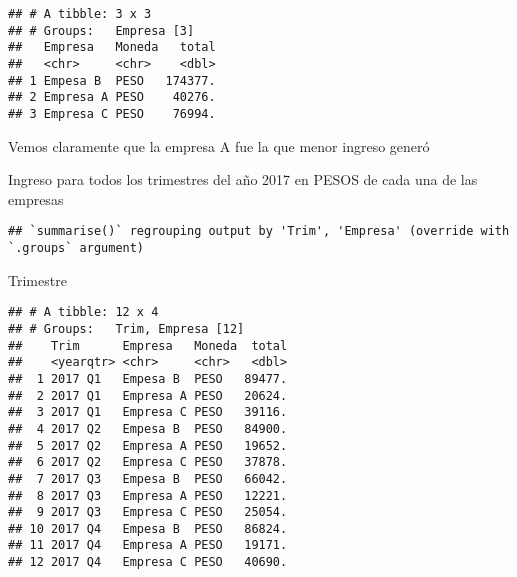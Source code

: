 \documentclass[]{article}
\newenvironment{Shaded}{\begin{snugshade}}{\end{snugshade}}
\newcommand{\DataTypeTok}[1]{\textcolor[rgb]{0.13,0.29,0.53}{#1}}
\newcommand{\KeywordTok}[1]{\textcolor[rgb]{0.13,0.29,0.53}{\textbf{#1}}}
\newcommand{\NormalTok}[1]{#1}
\newcommand{\OperatorTok}[1]{\textcolor[rgb]{0.81,0.36,0.00}{\textbf{#1}}}
\newcommand{\StringTok}[1]{\textcolor[rgb]{0.31,0.60,0.02}{#1}}
\begin{document}
\begin{verbatim}
## # A tibble: 3 x 3
## # Groups:   Empresa [3]
##   Empresa   Moneda   total
##   <chr>     <chr>    <dbl>
## 1 Empesa B  PESO   174377.
## 2 Empresa A PESO    40276.
## 3 Empresa C PESO    76994.
\end{verbatim}

Vemos claramente que la empresa A fue la que menor ingreso generó

Ingreso para todos los trimestres del año 2017 en PESOS de cada una de
las empresas

\begin{Shaded}
\end{Shaded}

\begin{verbatim}
## `summarise()` regrouping output by 'Trim', 'Empresa' (override with `.groups` argument)
\end{verbatim}

\begin{Shaded}
\begin{Highlighting}[]
\NormalTok{Trimestre}
\end{Highlighting}
\end{Shaded}

\begin{verbatim}
## # A tibble: 12 x 4
## # Groups:   Trim, Empresa [12]
##    Trim      Empresa   Moneda  total
##    <yearqtr> <chr>     <chr>   <dbl>
##  1 2017 Q1   Empesa B  PESO   89477.
##  2 2017 Q1   Empresa A PESO   20624.
##  3 2017 Q1   Empresa C PESO   39116.
##  4 2017 Q2   Empesa B  PESO   84900.
##  5 2017 Q2   Empresa A PESO   19652.
##  6 2017 Q2   Empresa C PESO   37878.
##  7 2017 Q3   Empesa B  PESO   66042.
##  8 2017 Q3   Empresa A PESO   12221.
##  9 2017 Q3   Empresa C PESO   25054.
## 10 2017 Q4   Empesa B  PESO   86824.
## 11 2017 Q4   Empresa A PESO   19171.
## 12 2017 Q4   Empresa C PESO   40690.
\end{verbatim}
\end{document}
